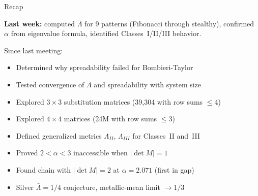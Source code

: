 \documentclass[aspectratio=169, 11pt]{beamer}
\begin{document}
\begin{frame}[shrink=3]{Recap}

\small
\textbf{Last week:} computed $\bar\Lambda$ for 9 patterns (Fibonacci through stealthy),
confirmed $\alpha$ from eigenvalue formula, identified Classes~I/II/III behavior.

\medskip
\normalsize
Since last meeting:
\begin{itemize}
  \item Determined why spreadability failed for Bombieri-Taylor
  \item Tested convergence of $\bar\Lambda$ and spreadability with system size
  \item Explored $3\times3$ substitution matrices (39,304 with row sums $\leq4$)
  \item Explored $4\times4$ matrices (24M with row sums $\leq3$)
  \item Defined generalized metrics $\Lambda_{II}$, $\Lambda_{III}$ for Classes~II and~III
  \item Proved $2{<}\alpha{<}3$ inaccessible when $|\det M|=1$
  \item Found chain with $|\det M|=2$ at $\alpha=2.071$ (first in gap)
  \item Silver $\bar\Lambda=1/4$ conjecture, metallic-mean limit $\to 1/3$
\end{itemize}

\end{frame}
\end{document}
